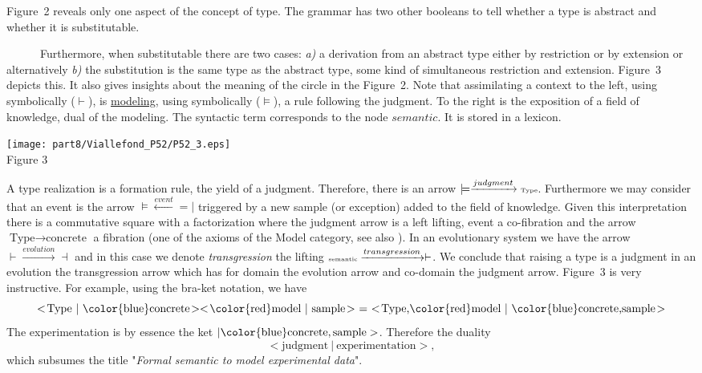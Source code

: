 Figure~2 reveals only one aspect of the concept of type. The grammar has two other booleans to tell whether a type is abstract and whether it is substitutable.\\ 
\noindent
\begin{minipage}[h]{7.0cm}
\indent
~~~~~~Furthermore, when substitutable there are two cases: {\it a)} a derivation from an abstract type either by restriction or by extension or alternatively {\it b)} the substitution is the same type as the abstract type, some kind of simultaneous restriction and extension. Figure~3 depicts this. It also gives insights about the meaning of the circle in the Figure~2. Note that assimilating a context to the left, using symbolically ($\vdash$), is \underline{modeling}, using symbolically ($\models$), a rule following the judgment. To the right is the exposition of a field of knowledge, dual of the modeling. The syntactic term corresponds to the node $semantic$. It is stored in a lexicon.

\end{minipage}
\begin{minipage}[h]{7.0cm}
 \begin{center}

  \texttt{[image: part8/Viallefond\_P52/P52\_3.eps]}
\\ Figure 3

 \end{center}
\end{minipage}
\hfill

A type realization is a formation rule, the yield of a judgment. Therefore, there is an arrow $\models\xrightarrow{judgment}\text{\tiny Type}$. Furthermore we may consider that an event is the arrow $\models\xleftarrow{event}=\!\!\!|$ triggered by a new sample (or exception) added to the field of knowledge. Given this interpretation there is a commutative square with a factorization where the judgment arrow is a left lifting, event a co-fibration and the arrow  $\text{Type}\rightarrow\text{concrete}$ a fibration (one of the axioms of the Model category, see also \cite{awodey_2009}). In an evolutionary system we have the arrow $\overset{}{\vdash}\xrightarrow{evolution}\overset{}{\dashv}$ and in this case we denote {\it transgression} the lifting $\overset{}{\text{\tiny semantic}}\xrightarrow{transgression}\overset{}{\vdash}$. We conclude that raising a type is a judgment in an evolution the transgression arrow which has for domain the evolution arrow and co-domain the judgment arrow. Figure~3 is very instructive. For example, using the bra-ket notation, we have \begin{displaymath}
<\!\text{Type}~|~\text{\color{blue}concrete}\!
><\!\text{\color{red}model}~|~\text{sample}\!>~ =~ 
<\!\text{Type,{\color{red}model}}~|~\text{{\color{blue}concrete},sample}\!>
\end{displaymath}
The experimentation is by essence the ket $|\text{\color{blue}concrete},\text{sample}>$. Therefore the duality 
\begin{displaymath}
<\!\text{judgment}~|~\text{experimentation}\!>,
\end{displaymath}
which subsumes the title "{\it Formal semantic to model experimental data}".

